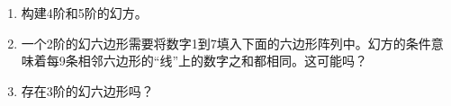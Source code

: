 \begin{enumerate}
    \item 构建4阶和5阶的幻方。
    
    \wbvfill
    
    \workbookpagebreak
    
    \item 一个2阶的幻六边形需要将数字1到7填入下面的六边形阵列中。幻方的条件意味着每9条相邻六边形的“线”上的数字之和都相同。这可能吗？
    \begin{center}
    
    \end{center}
    
    \wbvfill
    
    \item 存在3阶的幻六边形吗？
    
    \wbvfill
    
    \end{enumerate}
    
    
    
